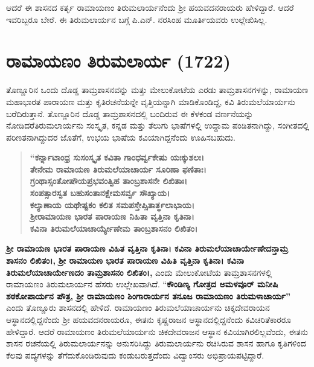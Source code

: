 ಆದರೆ ಈ ಶಾಸನದ ಕರ್ತೃ ರಾಮಾಯಣಂ ತಿರುಮಲಾರ್ಯನೆಂದು ಶ‍್ರೀ ಹಯವದನರಾಯರು ಹೇಳಿದ್ದಾರೆ. ಆದರೆ ಇವರಿಬ್ಬರೂ ಬೇರೆ. ಈ ತಿರುಮಲಾರ್ಯನ ಬಗ್ಗೆ ಪಿ.ಎನ್​. ನರಸಿಂಹ ಮೂರ್ತಿಯವರು ಉಲ್ಲೇಖಿಸಿಲ್ಲ.

\section*{ರಾಮಾಯಣಂ ತಿರುಮಲಾರ್ಯ (1722)}

ತೊಣ್ಣೂರಿನ ಒಂದು ದೊಡ್ಡ ತಾಮ್ರಶಾಸನವನ್ನು ಮತ್ತು ಮೇಲುಕೋಟೆಯ ಎರಡು ತಾಮ್ರಶಾಸನಗಳನ್ನು, ರಾಮಾಯಣ ಮಹಾಭಾರತ ಪಾರಾಯಣ ಮತ್ತು ಕೃತಿರಚನೆಯನ್ನೇ ವೃತ್ತಿಯನ್ನಾಗಿ ಮಾಡಿಕೊಂಡಿದ್ದ, ಕವಿ ತಿರುಮಲೆಯಾರ್ಯನು ಬರೆದಿರುತ್ತಾನೆ. ತೊಣ್ಣೂರಿನ ದೊಡ್ಡ ತಾಮ್ರಶಾಸನದಲ್ಲಿ ಬಂದಿರುವ ಈ ಕೆಳಕಂಡ ವರ್ಣನೆಯನ್ನು ನೋಡಿದರೆ\break ತಿರುಮಲಾರ್ಯನು ಸಂಸ್ಕೃತ, ಕನ್ನಡ ಮತ್ತು ತೆಲುಗು ಭಾಷೆಗಳಲ್ಲಿ ಉದ್ದಾಮ ಪಂಡಿತನಾಗಿದ್ದು, ಸಂಗೀತದಲ್ಲಿ ಪರಿಣತ\-ನಾಗಿದ್ದುದರ ಜೊತೆಗೆ, ಉಭಯ ಭಾಷೆಯ ಕವಿಯಾಗಿದ್ದನೆಂದು ಊಹಿಸಬಹುದು.

\begin{verse}
\textbf{“ಕರ್ನ್ನಾಟಾಂಧ್ರ ಸುಸಂಸ್ಕೃತ ಕವಿತಾ ಗಾಂಧರ್ವ್ವಕೇಷು ಯಃಕ್ಕುಶಲಃ। } \\\textbf{ತೇನೇಮ ರಾಮಾಯಣ ತಿರುಮಲೆಯಾಚಾರ್ಯ ಸೂರಿಣಾ ಫಣಿತಾಃ।} \\\textbf{ಗ್ರಂಥಾಸ್ಸಂತೋಷೌಯಪ್ರಭವಂತ್ವಿಹ ತಾಂಬ್ರಶಾಸನೇ ಲಿಖಿತಾಃ।} \\\textbf{ಸಂಪತ್ಸಾರಸ್ವತ ಬಹುಸಂತಾನಕ್ಷೇಮಸರ್ವ್ವ ಸೌಖ್ಯಾಯ।} \\\textbf{ಕಲ್ಯಾಣಾಯ ಯಥೇಷ್ಟಕಂ ಕಲಿತ ಸಮಪಸ್ತೇಪ್ಸಿತಾರ್ತ್ಥಲಾಭಾಯ।} \\\textbf{ಶ‍್ರೀರಾಮಾಯಣ ಭಾರತ ಪಾರಾಯಣ ನಿಹಿತಾ ವೃತ್ತಿನಾ ಕೃತಿನಾ।} \\\textbf{ಕವಿನಾ ತಿರುಮಲೆಯಾಚಾರ್ಯ್ಯೇಣೇಮ ತಾಂಬ್ರಶಾಸನಂ ಲಿಖಿತಂ।}
\end{verse}

\textbf{ಶ‍್ರೀ ರಾಮಾಯಣ ಭಾರತ ಪಾರಾಯಣ ವಿಹಿತ ವೃತ್ತಿನಾ ಕೃತಿನಾ। ಕವಿನಾ ತಿರುಮಲೆಯಾಚಾರ್ಯೇಣೇದನ್ತಾಮ್ರ ಶಾಸನಂ ಲಿಖಿತಂ।,}\textbf{ ಶ‍್ರೀ ರಾಮಾಯಣ ಭಾರತ ಪಾರಾಯಣ ವಿಹಿತಿ ವೃತ್ತಿನಾ ಕೃತಿನಾ। ಕವಿನಾ ತಿರುಮಲೆಯಾಚಾರ್ಯೇಣದಂ ತಾಮ್ರಶಾಸನಂ ಲಿಖಿತಂ।,} ಎಂದು ಮೇಲುಕೋಟೆಯ ತಾಮ್ರಶಾಸನಗಳಲ್ಲಿ ರಾಮಾಯಣಂ ತಿರುಮಲಾರ್ಯನ ಹೆಸರು ಉಲ್ಲೇಖವಾಗಿದೆ. “\textbf{ಕೌಂಡಿಣ್ಯ ಗೋತ್ರದ ಅಮಳವೂರ್​ ಮನೀಷಿ ಶಠಕೋಪಾರ್ಯನ ಪೌತ್ರ, ಶ‍್ರೀ ರಾಮಾಯಣಂ ಶಿಂಗಾರಾರ್ಯನ ತನೂಜ ರಾಮಾಯಣಂ ತಿರುಮಳಾಚಾರ್ಯ”} ಎಂದು ತೊಣ್ಣೂರು ಶಾಸನದಲ್ಲಿ ಹೇಳಿದೆ. ರಾಮಾಯಣಂ ತಿರುಮಲೆಯಾಚಾರ್ಯನು ಚಿಕ್ಕದೇವರಾಯನ ಆಸ್ಥಾನದಲ್ಲಿದ್ದನೆಂದು ಶ‍್ರೀ ಹಯವದನರಾಯರೂ, ಈತನು ಕೃಷ್ಣರಾಜನ ಆಸ್ಥಾನದಲ್ಲಿದ್ದನೆಂದು ಕವಿಚರಿತೆಕಾರರೂ ಹೇಳಿದ್ದಾರೆ. ಆದರೆ ರಾಮಾಯಣಂ ತಿರುಮಲೆಯಾರ್ಯನು ಚಿಕದೇವರಾಜನ ಆಸ್ಥಾನ ಕವಿಯಾಗಿರಲಿಲ್ಲವೆಂದು, ಈತನು ಶಾಸನ ರಚನೆಯಲ್ಲಿ ತಿರುಮಲಾರ್ಯನನ್ನು ಅನುಸರಿಸಿದ್ದು ತಿರುಮಲಾರ್ಯನು ರಚಿಸಿರುವ ಶಾಸನ ಹಾಗೂ ಕೃತಿಗಳಿಂದ ಕೆಲವು ಪದ್ಯಗಳನ್ನು ತೆಗೆದುಕೊಂಡಿರುವುದು ಕಂಡುಬರುತ್ತದೆಂದು ವಿದ್ವಾಂಸರು ಅಭಿಪ್ರಾಯಪಟ್ಟಿದ್ದಾರೆ.

